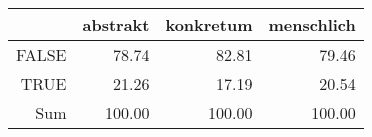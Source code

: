\begin{tabular}{rrrr}
  \hline
 & abstrakt & konkretum & menschlich \\ 
  \hline
FALSE & 78.74 & 82.81 & 79.46 \\ 
  TRUE & 21.26 & 17.19 & 20.54 \\ 
  Sum & 100.00 & 100.00 & 100.00 \\ 
   \hline
\end{tabular}
